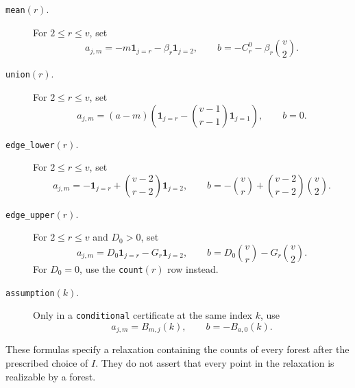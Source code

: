 \begin{description}
\item[\texttt{mean}$(r)$.]
For $2\le r\le v$, set
\[
 a_{j,m}=-m\mathbf{1}_{j=r}-\beta_r\mathbf{1}_{j=2},\qquad
 b=-C_r^0-\beta_r\binom v2.
\]

\item[\texttt{union}$(r)$.]
For $2\le r\le v$, set
\[
 a_{j,m}=(a-m)\left(\mathbf{1}_{j=r}
                -\binom{v-1}{r-1}\mathbf{1}_{j=1}\right),\qquad b=0.
\]

\item[\texttt{edge\_lower}$(r)$.]
For $2\le r\le v$, set
\[
 a_{j,m}=-\mathbf{1}_{j=r}+\binom{v-2}{r-2}\mathbf{1}_{j=2},\qquad
 b=-\binom vr+\binom{v-2}{r-2}\binom v2.
\]

\item[\texttt{edge\_upper}$(r)$.]
For $2\le r\le v$ and $D_0>0$, set
\[
 a_{j,m}=D_0\mathbf{1}_{j=r}-G_r\mathbf{1}_{j=2},\qquad
 b=D_0\binom vr-G_r\binom v2.
\]
For $D_0=0$, use the \texttt{count}$(r)$ row instead.

\item[\texttt{assumption}$(k)$.]
Only in a \texttt{conditional} certificate at the same index $k$, use
\[
 a_{j,m}=B_{m,j}(k),\qquad b=-B_{a,0}(k).
\]
\end{description}

These formulas specify a relaxation containing the counts of every
forest after the prescribed choice of $I$.  They do not assert that
every point in the relaxation is realizable by a forest.

